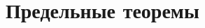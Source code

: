 \section{Предельные теоремы}

\begin{comment}
\begin{problem}
Bывод распределения Хольцмарка: Рассмотрим шар радиуса $r$ с центром в начале координат и $n$ звезд (точек), расположенных в нем наудачу и независимо друг от друга. Пусть каждая звезда имеет единичную массу. Обозначим $X_{1} ,...,X_{n} $ -компоненты гравитационных сил, соответствующие отдельным звездам, и положим $S_{n} =X_{1} +...+X_{n} $. Устремим $r$ и $n$ к бесконечности так, чтобы $\frac{4}{3} \pi r^{3} n^{-1} \to \lambda $. Показать, что распределение величины $S_{n} $ стремится к симметричному устойчивому распределению с $\alpha ={3\mathord{\left/ {\vphantom {3 2}} \right. \kern-\nulldelimiterspace} 2} $. Можно показать, что задача по существу не изменится, если массу каждой звезды считать с.в. с единичным математическим ожиданием и массы различных звезд предполагать взаимно независимыми с.в. и не зависящими также от их расположения.
\end{problem}
\end{comment}

